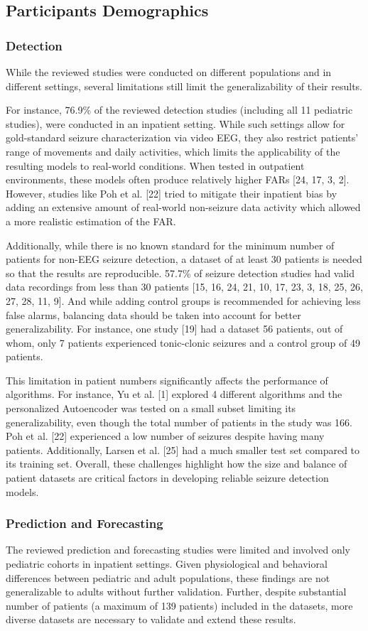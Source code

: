 \subsection{Participants Demographics}
\subsubsection{Detection}
While the reviewed studies were conducted on different populations and in different settings, several limitations still limit the generalizability of their results.

For instance, 76.9\% of the reviewed detection studies (including all 11 pediatric studies), were conducted in an inpatient setting. While such settings allow for gold-standard seizure characterization via video EEG, they also restrict patients’ range of movements and daily activities, which limits the applicability of the resulting models to real-world conditions. When tested in outpatient environments, these models often produce relatively higher FARs [24, 17, 3, 2]. However, studies like Poh et al. [22] tried to mitigate their inpatient bias by adding an extensive amount of real-world non-seizure data activity which allowed a more realistic estimation of the FAR. 

Additionally, while there is no known standard for the minimum number of patients for non-EEG seizure detection, a dataset of at least 30 patients is needed so that the results are reproducible. 57.7\% of seizure detection studies had valid data recordings from less than 30 patients [15, 16, 24, 21, 10, 17, 23, 3, 18, 25, 26, 27, 28, 11, 9]. And while adding control groups is recommended for achieving less false alarms, balancing data should be taken into account for better generalizability. For instance, one study [19] had a dataset 56 patients, out of whom, only 7 patients experienced tonic-clonic seizures and a control group of 49 patients. 

This limitation in patient numbers significantly affects the performance of algorithms. For instance, Yu et al. [1] explored 4 different algorithms and the personalized Autoencoder was tested on a small subset limiting its generalizability, even though the total number of patients in the study was 166. Poh et al. [22] experienced a low number of seizures despite having many patients. Additionally, Larsen et al. [25] had a much smaller test set compared to its training set. Overall, these challenges highlight how the size and balance of patient datasets are critical factors in developing reliable seizure detection models.

\subsubsection{Prediction and Forecasting}
The reviewed prediction and forecasting studies were limited and involved only pediatric cohorts in inpatient settings. Given physiological and behavioral differences between pediatric and adult populations, these findings are not generalizable to adults without further validation. Further, despite substantial number of patients (a maximum of 139 patients) included in the datasets, more diverse datasets are necessary to validate and extend these results.
